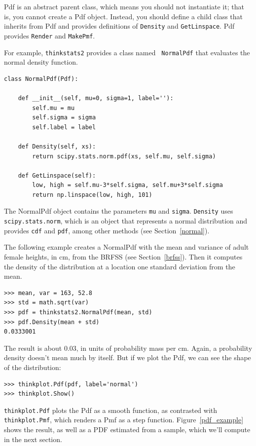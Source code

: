 \documentclass[12pt]{book}
\theoremstyle{exercise}
\begin{document}
Pdf is an abstract parent class, which means you should not
instantiate it; that is, you cannot create a Pdf object.  Instead, you
should define a child class that inherits from Pdf and provides
definitions of {\tt Density} and {\tt GetLinspace}.  Pdf provides
{\tt Render} and {\tt MakePmf}.

For example, {\tt thinkstats2} provides a class named {\tt
  NormalPdf} that evaluates the normal density function.

\begin{verbatim}
class NormalPdf(Pdf):

    def __init__(self, mu=0, sigma=1, label=''):
        self.mu = mu
        self.sigma = sigma
        self.label = label

    def Density(self, xs):
        return scipy.stats.norm.pdf(xs, self.mu, self.sigma)

    def GetLinspace(self):
        low, high = self.mu-3*self.sigma, self.mu+3*self.sigma
        return np.linspace(low, high, 101)
\end{verbatim}

The NormalPdf object contains the parameters {\tt mu} and
{\tt sigma}.  {\tt Density} uses
{\tt scipy.stats.norm}, which is an object that represents a normal
distribution and provides {\tt cdf} and {\tt pdf}, among other
methods (see Section~\ref{normal}).%

The following example creates a NormalPdf with the mean and variance
of adult female heights, in cm, from the BRFSS (see
Section~\ref{brfss}).  Then it computes the density of the
distribution at a location one standard deviation from the mean.%

\begin{verbatim}
>>> mean, var = 163, 52.8
>>> std = math.sqrt(var)
>>> pdf = thinkstats2.NormalPdf(mean, std)
>>> pdf.Density(mean + std)
0.0333001
\end{verbatim}

The result is about 0.03, in units of probability mass per cm.
Again, a probability density doesn't mean much by itself.  But if
we plot the Pdf, we can see the shape of the distribution:

\begin{verbatim}
>>> thinkplot.Pdf(pdf, label='normal')
>>> thinkplot.Show()
\end{verbatim}

{\tt thinkplot.Pdf} plots the Pdf as a smooth function,
as contrasted with {\tt thinkplot.Pmf}, which renders a Pmf as a
step function.  Figure~\ref{pdf_example} shows the result, as well
as a PDF estimated from a sample, which we'll compute in the next
section.%
\end{document}
